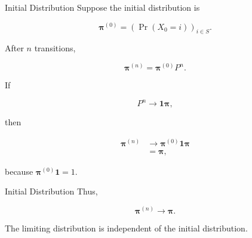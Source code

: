 \documentclass[
  ignorenonframetext,
  aspectratio=169,
]{beamer}
\begin{document}
\begin{frame}{Initial Distribution}
\protect{}\label{initial-distribution}
Suppose the initial distribution is

\[
\boldsymbol{\pi}^{(0)}
=
\left(\Pr(X_0=i)\right)_{i\in S}.
\]

After \(n\) transitions,

\[
\boxed{
\boldsymbol{\pi}^{(n)}
=
\boldsymbol{\pi}^{(0)}P^n.
}
\]

If

\[
P^n\longrightarrow\boldsymbol{1}\boldsymbol{\pi},
\]

then

\[
\begin{aligned}
\boldsymbol{\pi}^{(n)}
&\longrightarrow
\boldsymbol{\pi}^{(0)}
\boldsymbol{1}\boldsymbol{\pi}\\
&=\boldsymbol{\pi},
\end{aligned}
\]

because \(\boldsymbol{\pi}^{(0)}\boldsymbol{1}=1\).
\end{frame}

\begin{frame}{Initial Distribution}
\protect{}\label{initial-distribution-1}
Thus,

\[
\boxed{
\boldsymbol{\pi}^{(n)}
\longrightarrow\boldsymbol{\pi}.
}
\]

The limiting distribution is independent of the initial distribution.
\end{frame}
\end{document}
